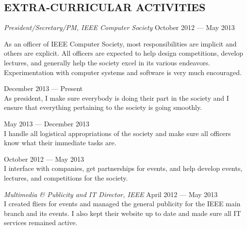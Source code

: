 \documentclass[margin]{res}
\begin{document}
\begin{resume}
  \section{EXTRA-CURRICULAR ACTIVITIES}             
  {\sl President/Secretary/PM, IEEE Computer Society}
  \hfill October 2012 --- May 2013 \\
  \vspace{-0.75em}
  \begin{adjustwidth}{1.5em}{0pt}
    As an officer of IEEE Computer Society, most responsibilities are
    implicit and others are explicit. All officers are expected to
    help design competitions, develop lectures, and generally help the
    society excel in its various endeavors. Experimentation with
    computer systems and software is very much encouraged.
      \begin{description}[leftmargin=1.5em] 
      \item [President] \hfill December 2013 --- Present \\
        As president, I make sure everybody is doing their part in the
        society and I ensure that everything pertaining to the society is
        going smoothly.
      \item [Secretary] \hfill May 2013 --- December 2013 \\
        I handle all logistical appropriations of the society and make
        sure all officers know what their immediate tasks are.
      \item [Project Manager] \hfill October 2012 --- May 2013 \\
        I interface with companies, get partnerships for events, and
        help develop events, lectures, and competitions for the
        society.
    \end{description}     
  \end{adjustwidth}
  {\sl Multimedia \& Publicity and IT Director, IEEE}
  \hfill April 2012 --- May 2013 \\
  I created fliers for events and managed the general publicity for
  the IEEE main branch and its events. I also kept their website up to
  date and made sure all IT services remained active.
\end{resume}
\end{document}
